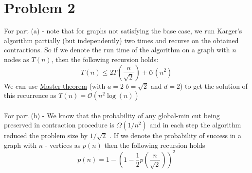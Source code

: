 \documentclass{article}
\numberwithin{equation}{section}
\newcommand{\bigOh}[1]{\mathcal{O}\left(#1\right)}
\newcommand{\bigOmega}[1]{\Omega\left(#1\right)}
\newcommand{\roundBrace}[1]{\left(#1\right)}
\begin{document}
\section{Problem 2} %
For part (a) - note that for graphs not satisfying the base case, we run Karger's algorithm partially (but independently) two times and recurse on the obtained contractions. So if we denote the run time of the algorithm on a graph with $n$ nodes as $T(n)$, then the following recursion holds:
\begin{equation}
    \label{e2}
    T(n) \le 2T\roundBrace{\frac{n}{\sqrt{2}}} + \bigOh{n^2}
\end{equation}
We can use \href{https://stanford-cs161.github.io/winter2022/assets/files/lecture3-notes.pdf}{Master theorem} (with $a=2$ $b=\sqrt{2}$ and $d = 2$) to get the solution of this recurrence as $T(n) = \bigOh{n^2\log(n)}$\\\\
For part (b) - We know that the probability of any global-min cut being preserved in contraction procedure is $\bigOmega{1/n^2}$ and in each step the algorithm reduced the problem size by $1/\sqrt{2}$ . If we denote the probability of success in a graph with $n$ - vertices as $p(n)$ then the following recursion holds
\begin{equation}
    p(n) = 1 - \roundBrace{1 - \frac{1}{2}p\roundBrace{\frac{n}{\sqrt{2}}}}^2
\end{equation}
\end{document}
